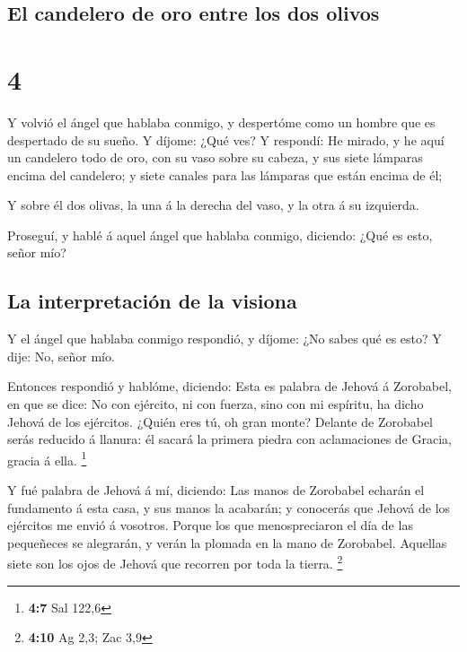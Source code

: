 \hypertarget{el-candelero-de-oro-entre-los-dos-olivos}{%
\subsection{El candelero de oro entre los dos
olivos}\label{el-candelero-de-oro-entre-los-dos-olivos}}

\hypertarget{section-3}{%
\section{4}\label{section-3}}

 Y volvió el ángel que hablaba conmigo, y despertóme como
un hombre que es despertado de su sueño.  Y díjome: ¿Qué
ves? Y respondí: He mirado, y he aquí un candelero todo de oro, con su
vaso sobre su cabeza, y sus siete lámparas encima del candelero; y siete
canales para las lámparas que están encima de él;

 Y sobre él dos olivas, la una á la derecha del vaso, y la
otra á su izquierda.

 Proseguí, y hablé á aquel ángel que hablaba conmigo,
diciendo: ¿Qué es esto, señor mío?

\hypertarget{la-interpretaciuxf3n-de-la-visiona}{%
\subsection{La interpretación de la
visiona}\label{la-interpretaciuxf3n-de-la-visiona}}

 Y el ángel que hablaba conmigo respondió, y díjome: ¿No
sabes qué es esto? Y dije: No, señor mío.

 Entonces respondió y hablóme, diciendo: Esta es palabra
de Jehová á Zorobabel, en que se dice: No con ejército, ni con fuerza,
sino con mi espíritu, ha dicho Jehová de los ejércitos. 
¿Quién eres tú, oh gran monte? Delante de Zorobabel serás reducido á
llanura: él sacará la primera piedra con aclamaciones de Gracia, gracia
á ella. \footnote{\textbf{4:7} Sal 122,6}

 Y fué palabra de Jehová á mí, diciendo: 
Las manos de Zorobabel echarán el fundamento á esta casa, y sus manos la
acabarán; y conocerás que Jehová de los ejércitos me envió á vosotros.
 Porque los que menospreciaron el día de las pequeñeces
se alegrarán, y verán la plomada en la mano de Zorobabel. Aquellas siete
son los ojos de Jehová que recorren por toda la tierra. \footnote{\textbf{4:10}
  Ag 2,3; Zac 3,9}

